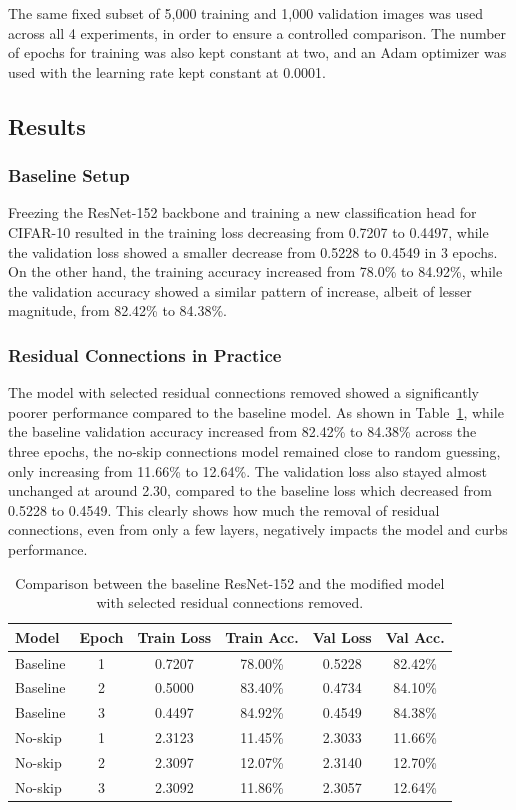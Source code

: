 \documentclass{article}
\begin{document}
The same fixed subset of 5,000 training and 1,000 validation images was used across all 4 experiments, in order to ensure a controlled comparison. The number of epochs for training was also kept constant at two, and an Adam optimizer was used with the learning rate kept constant at 0.0001.

\subsection{Results}

\subsubsection{Baseline Setup}

Freezing the ResNet-152 backbone and training a new classification head for CIFAR-10 resulted in the training loss decreasing from 0.7207 to 0.4497, while the validation loss showed a smaller decrease from 0.5228 to 0.4549 in 3 epochs. On the other hand, the training accuracy increased from 78.0\% to 84.92\%, while the validation accuracy showed a similar pattern of increase, albeit of lesser magnitude, from 82.42\% to 84.38\%.


\subsubsection{Residual Connections in Practice}

The model with selected residual connections removed showed a significantly poorer performance compared to the baseline model.  As shown in Table~\ref{tab:transfer_results}, while the baseline validation accuracy increased from 82.42\% to 84.38\% across the three epochs, the no-skip connections model remained close to random guessing, only increasing from 11.66\% to 12.64\%. The validation loss also stayed almost unchanged at around 2.30, compared to the baseline loss which decreased from 0.5228 to 0.4549. This clearly shows how much the removal of residual connections, even from only a few layers, negatively impacts the model and curbs performance.

\begin{table}[h]
\centering
\begin{tabular}{lccccc}
\toprule
Model & Epoch & Train Loss & Train Acc. & Val Loss & Val Acc. \\
\midrule
Baseline & 1 & 0.7207 & 78.00\% & 0.5228 & 82.42\% \\
Baseline & 2 & 0.5000 & 83.40\% & 0.4734 & 84.10\% \\
Baseline & 3 & 0.4497 & 84.92\% & 0.4549 & 84.38\% \\
No-skip & 1 & 2.3123 & 11.45\% & 2.3033 & 11.66\% \\
No-skip & 2 & 2.3097 & 12.07\% & 2.3140 & 12.70\% \\
No-skip & 3 & 2.3092 & 11.86\% & 2.3057 & 12.64\% \\
\bottomrule
\end{tabular}
\caption{Comparison between the baseline ResNet-152 and the modified model with selected residual connections removed.}
\label{tab:transfer_results}
\end{table}
\end{document}
